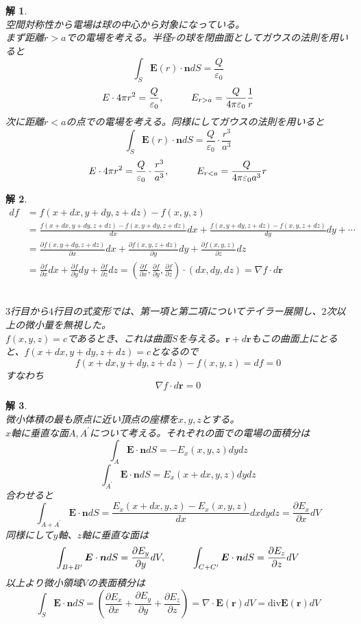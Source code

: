 \documentclass{jsarticle}
\newtheorem{ans}{解}[section]
\begin{document}
\begin{ans}~\\
空間対称性から電場は球の中心から対象になっている。\\
まず距離\(r>a\)での電場を考える。半径\(r\)の球を閉曲面としてガウスの法則を用いると
\[\int_{S}\bm{E}(r)\cdot\bm{n}dS=\frac{Q}{\varepsilon_{0}}\]
\[E\cdot4\pi r^{2}=\frac{Q}{\varepsilon_{0}},\hspace{10mm}E_{r>a}=\frac{Q}{4\pi\varepsilon_{0}}\frac{1}{r}\]
次に距離\(r<a\)の点での電場を考える。同様にしてガウスの法則を用いると
\[\int_{S}\bm{E}(r)\cdot\bm{n}dS=\frac{Q}{\varepsilon_{0}}\cdot\frac{r^{3}}{a^{3}}\]
\[E\cdot4\pi r^{2}=\frac{Q}{\varepsilon_{0}}\cdot\frac{r^{3}}{a^{3}},\hspace{10mm}E_{r<a}=\frac{Q}{4\pi\varepsilon_{0}a^{3}}r\]
\end{ans}

\begin{ans}~\\
\begin{align*}
df&=f(x+dx,y+dy,z+dz)-f(x,y,z)\\
&=\frac{f(x+dx,y+dy,z+dz)-f(x,y+dy,z+dz)}{dx}dx+\frac{f(x,y+dy,z+dz)-f(x,y,z+dz)}{dy}dy+\cdots\\
&=\frac{\partial f(x,y+dy,z+dz)}{\partial x}dx+\frac{\partial f(x,y,z+dz)}{\partial y}{dy}+\frac{\partial f(x,y,z)}{\partial z}dz\\
&=\frac{\partial f}{\partial x}dx+\frac{\partial f}{\partial y}dy+\frac{\partial f}{\partial z}dz=\left(\frac{\partial f}{\partial x},\frac{\partial f}{\partial y},\frac{\partial f}{\partial z}\right)\cdot(dx,dy,dz)=\nabla f\cdot d\bm{r}
\end{align*}　　　　　　　　　　　　　　　　　　　　　　　　　　　　　

\(3\)行目から\(4\)行目の式変形では、第一項と第二項についてテイラー展開し、\(2\)次以上の微小量を無視した。\\
\(f(x,y,z)=c\)であるとき、これは曲面\(S\)を与える。\(\bm{r}+d\bm{r}\)もこの曲面上にとると、\(f(x+dx,y+dy,z+dz)=c\)となるので
\[f(x+dx,y+dy,z+dz)-f(x,y,z)=df=0\]
すなわち
\[\nabla f\cdot d\bm{r}=0\]
\end{ans}

\begin{ans}~\\
微小体積の最も原点に近い頂点の座標を\(x,y,z\)とする。\\
\(x\)軸に垂直な面\(A,A^{\prime}\)について考える。それぞれの面での電場の面積分は
\[\int_{A}\bm{E}\cdot\bm{n}dS=-E_{x}(x,y,z)dydz\]
\[\int_{A^{\prime}}\bm{E}\cdot\bm{n}dS=E_{x}(x+dx,y,z)dydz\]
合わせると
\[\int_{A+A^{\prime}}\bm{E}\cdot\bm{n}dS=\frac{E_{x}(x+dx,y,z)-E_{x}(x,y,z)}{dx}dxdydz=\frac{\partial E_{x}}{\partial x}dV\]
同様にして\(y\)軸、\(z\)軸に垂直な面は
\[\int_{B+B^{\prime}}\bm{E}\cdot\bm{n}dS=\frac{\partial E_{y}}{\partial y}dV,\hspace{10mm}\int_{C+C^{\prime}}\bm{E}\cdot\bm{n}dS=\frac{\partial E_{z}}{\partial z}dV\]
以上より微小領域\(V\)の表面積分は
\[\int_{S}\bm{E}\cdot\bm{n}dS=\left(\frac{\partial E_{x}}{\partial x}+\frac{\partial E_{y}}{\partial y}+\frac{\partial E_{z}}{\partial z}\right)=\nabla\cdot\bm{E}(\bm{r})dV=\mathrm{div}\bm{E}(\bm{r})dV\]
\end{ans}
\end{document}
